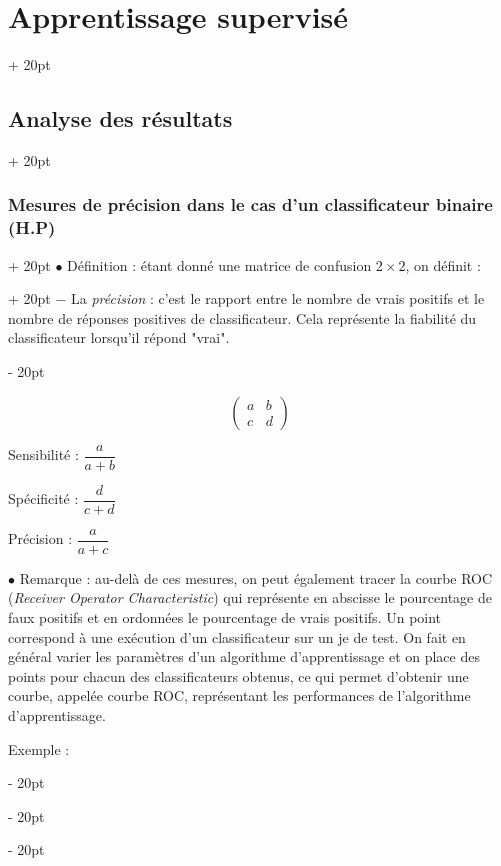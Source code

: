 \documentclass[a4paper, 12pt, twoside]{article}
\newcommand{\ind}[1][20pt]{\advance\leftskip + #1}
\newcommand{\deind}[1][20pt]{\advance\leftskip - #1}
\newenvironment{indt}[2][20pt]{#2 \par \ind[#1]}{\par \deind} %
\begin{document}
\begin{indt}{\section{Apprentissage supervisé}}
\begin{indt}{\subsection{Analyse des résultats}}
\begin{indt}{\subsubsection{Mesures de précision dans le cas d'un classificateur binaire (H.P)}}
\begin{indt}{$\bullet$ Définition : étant donné une matrice de confusion $2 \times 2$, on définit :}
                    $-$ La \emph{précision} : c'est le rapport entre le nombre de vrais positifs et le nombre de réponses positives de classificateur.
                    Cela représente la fiabilité du classificateur lorsqu'il répond "vrai".
                \end{indt}

                \[
                    \begin{pmatrix}
                        a & b
                        \\
                        c & d
                    \end{pmatrix}
                \]

                Sensibilité : $\dfrac{a}{a + b}$

                Spécificité : $\dfrac{d}{c + d}$

                Précision : $\dfrac{a}{a + c}$

                \vspace{12pt}
                
                $\bullet$ Remarque : au-delà de ces mesures, on peut également tracer la courbe ROC (\textit{Receiver Operator Characteristic}) qui représente en abscisse le pourcentage de faux positifs et en ordonnées le pourcentage de vrais positifs. Un point correspond à une exécution d'un classificateur sur un je de test. On fait en général varier les paramètres d'un algorithme d'apprentissage et on place des points pour chacun des classificateurs obtenus, ce qui permet d'obtenir une courbe, appelée courbe ROC, représentant les performances de l'algorithme d'apprentissage.

                \vspace{12pt}
                
                Exemple :

                \begin{center}
\end{center}
\end{indt}
\end{indt}
\end{indt}
\end{document}
